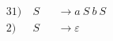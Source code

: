 \begin{alignat*}{3}
1) \ & S &&\rightarrow a\ S\ b\ S \\
2) \ & S &&\rightarrow \varepsilon \\
\end{alignat*}